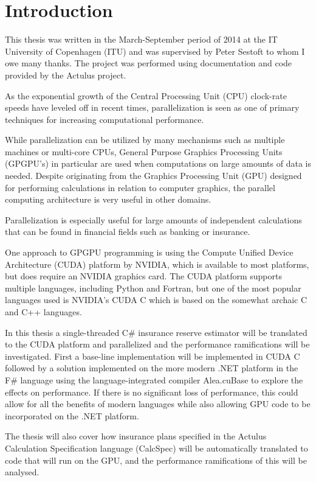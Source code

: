 \section{Introduction}
This thesis was written in the March-September period of 2014 at the IT University of Copenhagen (ITU) and was supervised by Peter Sestoft to whom I owe many thanks. 
The project was performed using documentation and code provided by the Actulus project.

As the exponential growth of the Central Processing Unit (CPU) clock-rate speeds have leveled off in recent times\cite{ross2008cpu}, parallelization is seen as one of primary techniques for increasing computational performance. 

While parallelization can be utilized by many mechanisms such as multiple machines or multi-core CPUs, General Purpose Graphics Processing Units (GPGPU's) in particular are used when computations on large amounts of data is needed. 
Despite originating from the Graphics Processing Unit (GPU) designed for performing calculations in relation to computer graphics, the parallel computing architecture is very useful in other domains.

Parallelization is especially useful for large amounts of independent calculations that can be found in financial fields such as banking or insurance.

One approach to GPGPU programming is using the Compute Unified Device Architecture (CUDA) platform by NVIDIA, which is available to most platforms, but does require an NVIDIA graphics card.
The CUDA platform supports multiple languages, including Python and Fortran, but one of the most popular languages used is NVIDIA's CUDA C which is based on the somewhat archaic C and C++ languages.

In this thesis a single-threaded C\# insurance reserve estimator will be translated to the CUDA platform and parallelized and the performance ramifications will be investigated.
First a base-line implementation will be implemented in CUDA C followed by a solution implemented on the more modern .NET platform in the F\# language using the language-integrated compiler Alea.cuBase to explore the effects on performance.
If there is no significant loss of performance, this could allow for all the benefits of modern languages while also allowing GPU code to be incorporated on the .NET platform.


The thesis will also cover how insurance plans specified in the Actulus Calculation Specification language (CalcSpec) will be automatically translated to code that will run on the GPU, and the performance ramifications of this will be analysed.


